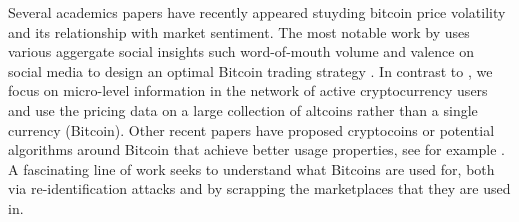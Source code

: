 Several academics papers have recently appeared stuyding bitcoin price volatility and its relationship with market sentiment. The most notable work by \cite{Garcia-bitcoin} uses various aggergate social insights such word-of-mouth volume and valence on social media to design an optimal Bitcoin trading strategy . In contrast to \cite{Garcia-bitcoin}, we focus on micro-level information in the network of active cryptocurrency users and use the pricing data on a large collection of altcoins rather than a single currency (Bitcoin). Other recent papers have proposed cryptocoins or potential algorithms around Bitcoin that achieve better usage properties, see for example \cite{bonneau2014mixcoin}.
A fascinating line of work \cite{meiklejohn2013fistful,soska2015measuring} seeks to understand what Bitcoins are used for, both via re-identification attacks and by scrapping the marketplaces that they are used in.

